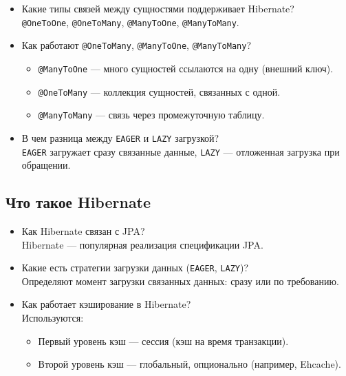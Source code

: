 \documentclass[a4paper,14pt]{article}
\begin{document}
\begin{itemize}
\item Какие типы связей между сущностями поддерживает Hibernate? \\
\texttt{@OneToOne}, \texttt{@OneToMany}, \texttt{@ManyToOne}, \texttt{@ManyToMany}.

\item Как работают \texttt{@OneToMany}, \texttt{@ManyToOne}, \texttt{@ManyToMany}? \\
\begin{itemize}
  \item \texttt{@ManyToOne} — много сущностей ссылаются на одну (внешний ключ).
  \item \texttt{@OneToMany} — коллекция сущностей, связанных с одной.
  \item \texttt{@ManyToMany} — связь через промежуточную таблицу.
\end{itemize}

\item В чем разница между \texttt{EAGER} и \texttt{LAZY} загрузкой? \\
\texttt{EAGER} загружает сразу связанные данные, \texttt{LAZY} — отложенная загрузка при обращении.
\end{itemize}

\subsection{Что такое Hibernate}

\begin{itemize}
\item Как Hibernate связан с JPA? \\
Hibernate — популярная реализация спецификации JPA.

\item Какие есть стратегии загрузки данных (\texttt{EAGER}, \texttt{LAZY})? \\
Определяют момент загрузки связанных данных: сразу или по требованию.

\item Как работает кэширование в Hibernate? \\
Используются:
\begin{itemize}
  \item Первый уровень кэш — сессия (кэш на время транзакции).
  \item Второй уровень кэш — глобальный, опционально (например, Ehcache).
\end{itemize}
\end{itemize}
\end{document}
